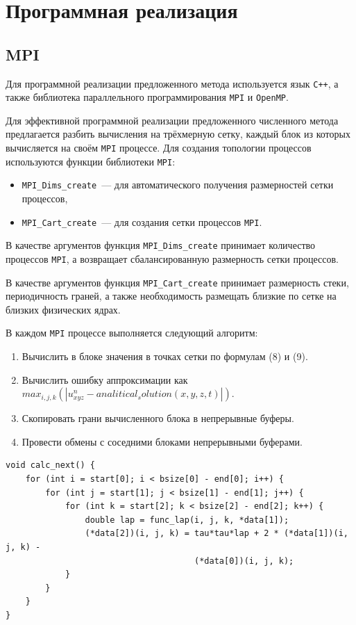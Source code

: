 \documentclass{article}
\begin{document}
\section{Программная реализация}
    \subsection{MPI}
    Для программной реализации предложенного метода используется язык {\tt C++}, а также 
    библиотека параллельного программирования {\tt MPI} и {\tt OpenMP}.
    
    Для эффективной программной реализации предложенного численного метода
    предлагается разбить вычисления на трёхмерную сетку, каждый блок
    из которых вычисляется на своём {\tt MPI} процессе. Для создания топологии процессов
    используются функции библиотеки {\tt MPI}: 
    \begin{itemize}
        \item {\tt MPI\_Dims\_create}~--- для автоматического получения размерностей сетки процессов,
        \item {\tt MPI\_Cart\_create}~--- для создания сетки процессов {\tt MPI}.
    \end{itemize}

    В качестве аргументов функция {\tt MPI\_Dims\_create} принимает количество процессов {\tt MPI},
    а возвращает сбалансированную размерность сетки процессов.

    В качестве аргументов функция {\tt MPI\_Cart\_create} принимает размерность стеки,
    периодичность граней, а также необходимость размещать близкие по сетке на близких 
    физических ядрах.

    В каждом {\tt MPI} процессе выполняется следующий алгоритм:
    \begin{enumerate}
        \item Вычислить в блоке значения в точках сетки по формулам (8) и (9).
        \item Вычислить ошибку аппроксимации как \(max_{i, j, k}(|u^n_{xyz} - analitical_solution(x, y, z, t)|)\).
        \item Скопировать грани вычисленного блока в непрерывные буферы.
        \item Провести обмены с соседними блоками непрерывными буферами.
    \end{enumerate}
\begin{lstlisting}
void calc_next() {
    for (int i = start[0]; i < bsize[0] - end[0]; i++) {
        for (int j = start[1]; j < bsize[1] - end[1]; j++) {
            for (int k = start[2]; k < bsize[2] - end[2]; k++) {
                double lap = func_lap(i, j, k, *data[1]);
                (*data[2])(i, j, k) = tau*tau*lap + 2 * (*data[1])(i, j, k) - 
                                      (*data[0])(i, j, k);
            }
        }
    } 
}
\end{lstlisting}
\end{document}
